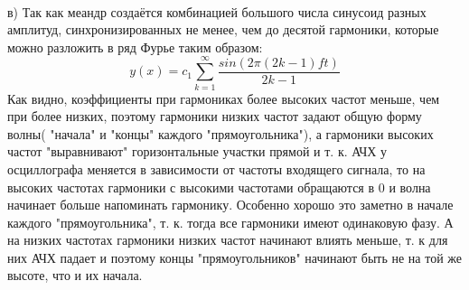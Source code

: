 \documentclass[a4paper, 12pt]{article}
\begin{document}
			\\
			\\
			\\
			\\
			\\
			\\
			\\
			\\
			\\
			\\
			\\
			\\
			\\
			\\
			\\
			\\
			\\
			\\
			\\
			\\
			\\
			\\
			\\
			\\
			\\
			\\
			\\
			\\
			в) Так как меандр создаётся комбинацией большого числа синусоид разных амплитуд, синхронизированных не менее, чем до десятой гармоники, которые можно разложить в ряд Фурье таким образом:
			$$y(x)= c_1 \sum_{k = 1}^{\infty} \frac{sin(2 \pi (2k - 1)ft)}{2k - 1}$$
			Как видно, коэффициенты при гармониках более высоких частот меньше, чем при более низких, поэтому гармоники низких частот задают общую форму волны( "начала" и "концы" каждого "прямоугольника"), а гармоники высоких частот "выравнивают" горизонтальные участки прямой и т. к. АЧХ у осциллографа меняется в зависимости от частоты входящего сигнала, то на высоких частотах гармоники с высокими частотами обращаются в 0 и волна начинает больше напоминать гармонику. Особенно хорошо это заметно в начале каждого "прямоугольника", т. к. тогда все гармоники имеют одинаковую фазу. А на низких частотах гармоники низких частот начинают влиять меньше, т. к для них АЧХ падает и поэтому концы "прямоугольников" начинают быть не на той же высоте, что и их начала.
			
\end{document}
